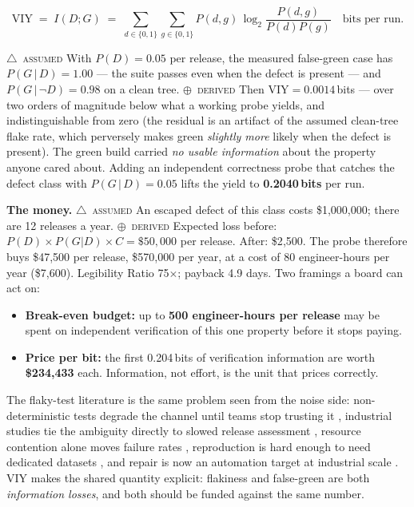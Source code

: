 \documentclass[11pt,a4paper]{article}
\providecommand{\textcite}[1]{\cite{#1}}
\newcommand{\derivedv}[1]{\textcolor{sigilviolet}{\textbf{#1}}}
\newcommand{\stD}{\textcolor{sigilviolet}{$\oplus$}~{\scriptsize\textsc{derived}}}
\newcommand{\stA}{\textcolor{sigilamber}{$\triangle$}~{\scriptsize\textsc{assumed}}}
\begin{document}
\[ \mathrm{VIY} \;=\; I(D;G) \;=\; \sum_{d\in\{0,1\}}\sum_{g\in\{0,1\}} P(d,g)\,\log_2\frac{P(d,g)}{P(d)P(g)} \quad\text{bits per run.} \]


\stA{} With $P(D)=0.05$ per release, the measured false-green case has $P(G\,|\,D)=1.00$ --- the suite passes even when the defect is present --- and $P(G\,|\,\lnot D)=0.98$ on a clean tree. \stD{} Then $\mathrm{VIY}=0.0014$\,bits --- over two orders of magnitude below what a working probe yields, and indistinguishable from zero (the residual is an artifact of the assumed clean-tree flake rate, which perversely makes green \emph{slightly more} likely when the defect is present). The green build carried \emph{no usable information} about the property anyone cared about. Adding an independent correctness probe that catches the defect class with $P(G\,|\,D)=0.05$ lifts the yield to \derivedv{0.2040\,bits} per run.


\textbf{The money.} \stA{} An escaped defect of this class costs \$1{,}000{,}000; there are 12 releases a year. \stD{} Expected loss before: $P(D)\times P(G|D)\times C = \$50{,}000$ per release. After: \$2{,}500. The probe therefore buys \$47{,}500 per release, \$570{,}000 per year, at a cost of 80 engineer-hours per year (\$7{,}600). Legibility Ratio 75$\times$; payback 4.9 days. Two framings a board can act on:

\begin{itemize}[leftmargin=1.4em,itemsep=2pt]
\item \textbf{Break-even budget:} up to \derivedv{500 engineer-hours per release} may be spent on independent verification of this one property before it stops paying.
\item \textbf{Price per bit:} the first 0.204\,bits of verification information are worth \derivedv{\$234{,}433} each. Information, not effort, is the unit that prices correctly.
\end{itemize}


The flaky-test literature is the same problem seen from the noise side: non-deterministic tests degrade the channel until teams stop trusting it \textcite{arxiv2208_14799}, industrial studies tie the ambiguity directly to slowed release assessment \textcite{arxiv2602_03556}, resource contention alone moves failure rates \textcite{arxiv2310_12132}, reproduction is hard enough to need dedicated datasets \textcite{arxiv2605_21677}, and repair is now an automation target at industrial scale \textcite{arxiv2511_14002}. VIY makes the shared quantity explicit: flakiness and false-green are both \emph{information losses}, and both should be funded against the same number.
\end{document}
